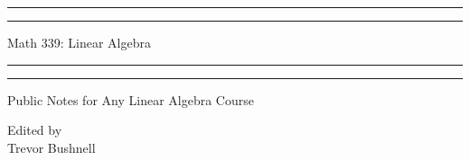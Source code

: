 \documentclass{package/notes}
\begin{document}
	\begin{titlepage} %
		
		\centering %
		
		\scshape %
		
		\vspace*{\baselineskip} %
		
		
		\rule{\textwidth}{1.6pt}\vspace*{-\baselineskip}\vspace*{2pt} %
		\rule{\textwidth}{0.4pt} %
		
		\vspace{0.75\baselineskip} %
		
		{\huge Math 339: Linear Algebra\\} %
		
		\vspace{0.75\baselineskip} %
		
		\rule{\textwidth}{0.4pt}\vspace*{-\baselineskip}\vspace{3.2pt} %
		\rule{\textwidth}{1.6pt} %
		
		\vspace{2\baselineskip} %
		
		
		\LARGE{Public Notes for Any Linear Algebra Course} 
		
		\vspace*{3\baselineskip} %
		
		
		
		\vspace{0.5\baselineskip} 
		
		
		
		\vspace{0.5\baselineskip} 
		
		
		
		\vfill 
		
		
		
		\vspace{0.3\baselineskip} 
		
		
		{\large Edited by\\  Trevor Bushnell} 
		
	\end{titlepage}
	\tableofcontents
\end{document}
